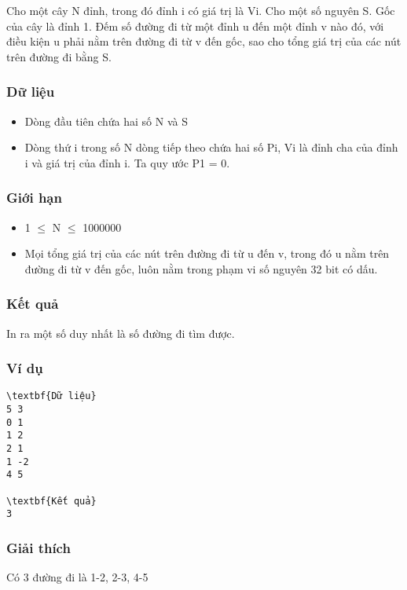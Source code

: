 



   Cho một cây N đỉnh, trong đó đỉnh i có giá trị là Vi. Cho một số nguyên S. Gốc của cây là đỉnh 1. Đếm số đường đi từ một đỉnh u đến một đỉnh v nào đó, với điều kiện u phải nằm trên đường đi từ v đến gốc, sao cho tổng giá trị của các nút trên đường đi bằng S.  

\subsubsection{   Dữ liệu  }
\begin{itemize}
	\item     Dòng đầu tiên chứa hai số N và S   
	\item     Dòng thứ i trong số N dòng tiếp theo chứa hai số Pi, Vi là đỉnh cha của đỉnh i và giá trị của đỉnh i. Ta quy ước P1 = 0.   
\end{itemize}

\subsubsection{   Giới hạn  }
\begin{itemize}
	\item     1  $\le$  N  $\le$  1000000   
	\item     Mọi tổng giá trị của các nút trên đường đi từ u đến v, trong đó u nằm trên đường đi từ v đến gốc, luôn nằm trong phạm vi số nguyên 32 bit có dấu.   
\end{itemize}

\subsubsection{   Kết quả  }

   In ra một số duy nhất là số đường đi tìm được.  

\subsubsection{   Ví dụ  }
\begin{verbatim}
\textbf{Dữ liệu}
5 3
0 1
1 2
2 1
1 -2
4 5

\textbf{Kết quả}
3
\end{verbatim}

\subsubsection{   Giải thích  }

   Có 3 đường đi là 1-2, 2-3, 4-5  

